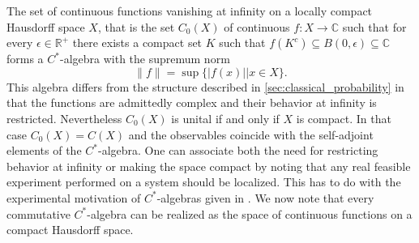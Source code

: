 \begin{example}
The set of continuous functions vanishing at infinity on a locally compact Hausdorff space $X$, that is the set $C_0(X)$ of continuous $f:X\rightarrow \mathbb{C}$ such that for every $\epsilon\in\mathbb{R}^+$ there exists a compact set $K$ such that $f(K^c)\subseteq B(0,\epsilon) \subseteq \mathbb{C}$ forms a $C^*$-algebra with the supremum norm
\begin{equation}
\|f\| = \sup\{|f(x)||x\in X\}.
\end{equation}
This algebra differs from the structure described in \ref{sec:classical_probability} in that the functions are admittedly complex and their behavior at infinity is restricted. Nevertheless $C_0(X)$ is unital if and only if $X$ is compact. In that case $C_0(X)=C(X)$ and the observables coincide with the self-adjoint elements of the $C^*$-algebra. One can associate both the need for restricting behavior at infinity or making the space compact by noting that any real feasible experiment performed on a system should be localized. This has to do with the experimental motivation of $C^*$-algebras given in \cite{Strocchi2008a}.
We now note that every commutative $C^*$-algebra can be realized as the space of continuous functions on a compact Hausdorff space. 
\end{example}


